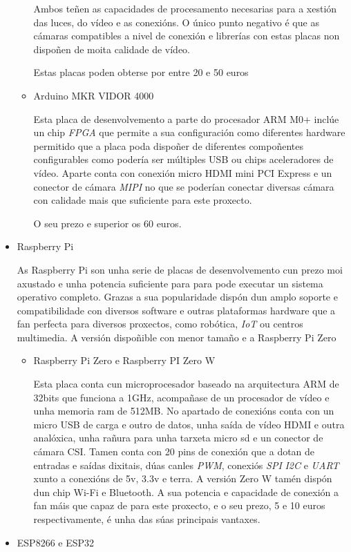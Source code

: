 \begin{itemize}
\begin{itemize}
Ambos teñen as capacidades de procesamento necesarias para a xestión das luces, do vídeo e as conexións. O único punto negativo é que as cámaras compatibles a nivel de conexión e librerías con estas placas non dispoñen de moita calidade de vídeo.

Estas placas poden obterse por entre 20 e 50 euros

        \item Arduino MKR VIDOR 4000

Esta placa de desenvolvemento a parte do procesador ARM M0+ inclúe un chip \emph{FPGA} que permite a sua configuración como diferentes hardware permitido que a placa poda dispoñer de diferentes compoñentes configurables como podería ser múltiples USB ou chips aceleradores de vídeo. Aparte conta con conexión micro HDMI mini PCI Express e un conector de cámara \emph{MIPI} no que se poderían conectar diversas cámara con calidade mais que suficiente para este proxecto.

O seu prezo e superior os 60 euros.
    \end{itemize}
    \item Raspberry Pi

As Raspberry Pi son unha serie de placas de desenvolvemento cun prezo moi axustado e unha potencia suficiente para para pode executar un sistema operativo completo. Grazas a sua popularidade dispón dun amplo soporte e compatibilidade con diversos software e outras plataformas hardware que a fan perfecta para diversos proxectos, como robótica, \emph{IoT} ou centros multimedia.
A versión dispoñible con menor tamaño e a Raspberry Pi Zero
    \begin{itemize}
        \item Raspberry Pi Zero e Raspberry PI Zero W

Esta placa conta cun microprocesador baseado na arquitectura ARM de 32bits que funciona a 1GHz, acompañase de un procesador de vídeo e unha memoria ram de 512MB. No apartado de conexións conta con un micro USB de carga e outro de datos, unha saída de vídeo HDMI e outra analóxica, unha rañura para unha tarxeta micro sd e un conector de cámara CSI. Tamen conta con 20 pins de conexión que a dotan de entradas e saídas dixitais, dúas canles \emph{PWM}, conexiós \emph{SPI} \emph{I2C} e \emph{UART} xunto a conexións de 5v, 3.3v e terra. A versión Zero W tamén dispón dun chip Wi-Fi e Bluetooth.
A sua potencia e capacidade de conexión a fan máis que capaz de para este proxecto, e o seu prezo, 5 e 10 euros respectivamente, é unha das súas principais vantaxes.
    \end{itemize}
    \item ESP8266 e ESP32


\end{itemize}
